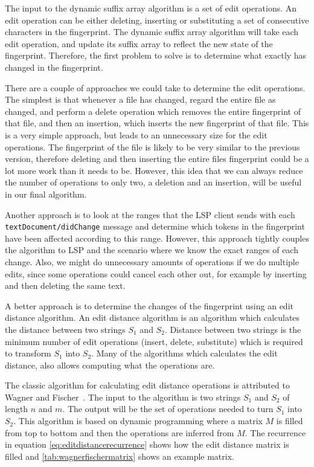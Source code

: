 The input to the dynamic suffix array algorithm is a set of edit operations. An edit
operation can be either deleting, inserting or substituting a set of consecutive
characters in the fingerprint. The dynamic suffix array algorithm will take each edit
operation, and update its suffix array to reflect the new state of the fingerprint.
Therefore, the first problem to solve is to determine what exactly has changed in the
fingerprint. 

There are a couple of approaches we could take to determine the edit operations. The
simplest is that whenever a file has changed, regard the entire file as changed, and
perform a delete operation which removes the entire fingerprint of that file, and then an
insertion, which inserts the new fingerprint of that file. This is a very simple approach,
but leads to an unnecessary size for the edit operations. The fingerprint of the file is
likely to be very similar to the previous version, therefore deleting and then inserting
the entire files fingerprint could be a lot more work than it needs to be. However, this
idea that we can always reduce the number of operations to only two, a deletion and an
insertion, will be useful in our final algorithm.

Another approach is to look at the ranges that the LSP client sends with each
\verb|textDocument/didChange| message and determine which tokens in the fingerprint have
been affected according to this range. However, this approach tightly couples the
algorithm to LSP and the scenario where we know the exact ranges of each change. Also, we
might do unnecessary amounts of operations if we do multiple edits, since some operations
could cancel each other out, for example by inserting and then deleting the same text.

A better approach is to determine the changes of the fingerprint using an edit distance
algorithm. An edit distance algorithm is an algorithm which calculates the distance
between two strings $S_1$ and $S_2$. Distance between two strings is the minimum number of
edit operations (insert, delete, substitute) which is required to transform $S_1$ into
$S_2$. Many of the algorithms which calculates the edit distance, also allows computing
what the operations are.

The classic algorithm for calculating edit distance operations is attributed to Wagner and
Fischer~\cite{WagnerFischer}. The input to the algorithm is two strings $S_1$ and $S_2$ of
length $n$ and $m$. The output will be the set of operations needed to turn $S_1$ into
$S_2$. This algorithm is based on dynamic programming where a matrix $M$ is filled from
top to bottom and then the operations are inferred from $M$. The recurrence in equation
\ref{eq:editdistancerecurrence} shows how the edit distance matrix is filled and
\ref{tab:wagnerfischermatrix} shows an example matrix.

